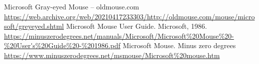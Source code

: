 \documentclass[11pt, a4paper]{article}
\begin{document}
\begin{thebibliography}{9}
 Microsoft Gray-eyed Mouse -- oldmouse.com \url{https://web.archive.org/web/20210417233303/http://oldmouse.com/mouse/microsoft/greyeyed.shtml}
 Microsoft Mouse User Guide. Microsoft, 1986. \url{https://minuszerodegrees.net/manuals/Microsoft/Microsoft%20Mouse%20-%20User's%20Guide%20-%201986.pdf}
 Microsoft Mouse. Minus zero degrees \url{https://www.minuszerodegrees.net/msmouse/Microsoft%20mouse.htm}
\end{thebibliography}
\end{document}

